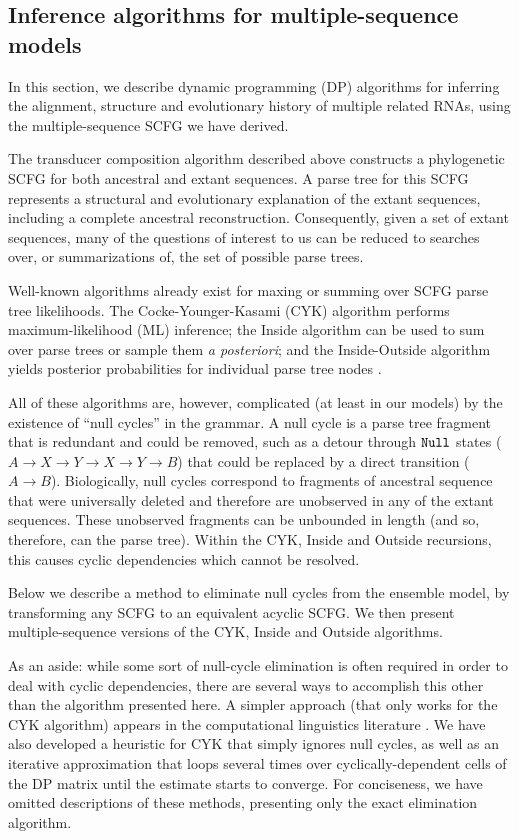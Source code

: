 \documentclass[10pt]{article}
\begin{document}
\subsection*{Inference algorithms for multiple-sequence models}

In this section, we describe dynamic programming (DP) algorithms for
inferring the alignment, structure and evolutionary history
of multiple related RNAs, using the multiple-sequence SCFG we have derived.

The transducer composition algorithm described above constructs a phylogenetic SCFG
for both ancestral and extant sequences.
A parse tree for this SCFG represents a structural and evolutionary
explanation of the extant sequences, including a complete ancestral reconstruction.
Consequently, given a set of extant sequences, many of the questions of interest to us
can be reduced to searches over, or summarizations of, the set of possible parse trees.

Well-known algorithms already exist for maxing or summing over SCFG parse tree likelihoods.
The Cocke-Younger-Kasami (CYK) algorithm performs maximum-likelihood (ML) inference;
the Inside algorithm can be used to sum over parse trees or sample them {\em a posteriori};
and the Inside-Outside algorithm yields posterior probabilities for individual parse tree nodes \cite{Durbin98}.

All of these algorithms are, however, complicated (at least in our models) by
the existence of ``null cycles'' in the grammar.
A null cycle is a parse tree fragment that is redundant and could be removed, such as a detour through $\mathtt{Null}$ states ($A \to X \to Y \to X \to Y \to B$)
that could be replaced by a direct transition ($A \to B$).
Biologically, null cycles correspond to fragments of ancestral sequence that were universally deleted and therefore
are unobserved in any of the extant sequences.
These unobserved fragments can be unbounded in length (and so, therefore, can the parse tree).
Within the CYK, Inside and Outside recursions, this causes cyclic dependencies which cannot be resolved.

Below we describe a method to eliminate null cycles from
the ensemble model, by transforming any SCFG to an equivalent acyclic SCFG.
We then present multiple-sequence versions of the CYK, Inside and Outside algorithms.

As an aside: while some sort of null-cycle elimination is often required in order to deal with cyclic dependencies, there are several ways to accomplish this other than the algorithm presented here.
A simpler approach (that only works for the CYK algorithm) appears in the computational linguistics literature \cite{GecsegSteinby97}.
We have also developed a heuristic for CYK that simply ignores null cycles, as well as an iterative approximation that loops several times over cyclically-dependent cells of the DP matrix
until the estimate starts to converge. For conciseness, we have omitted descriptions of these methods, presenting only the exact elimination algorithm.
\end{document}
